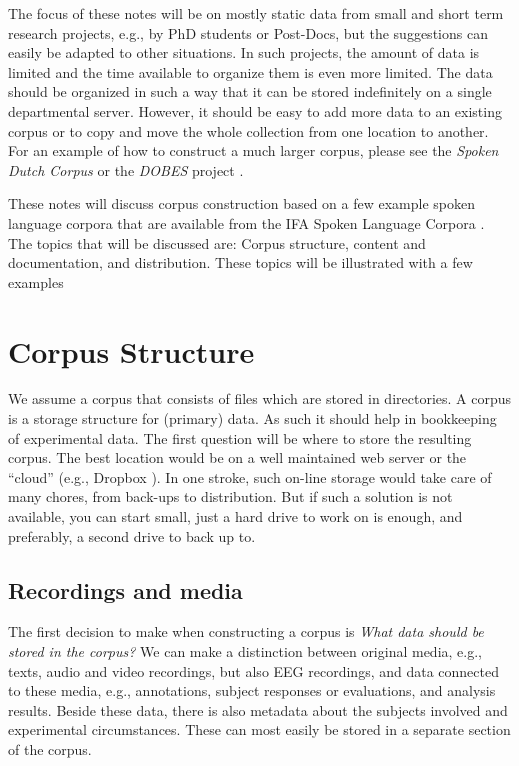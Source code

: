 \documentclass[10pt, a4paper]{article}
\begin{document}
The focus of these notes will be on mostly static data from small and short term research projects, e.g., by PhD students or Post-Docs, but the suggestions can easily be adapted to other situations. In such projects, the amount of data is limited and the time available to organize them is even more limited. The data should be organized in such a way that it can be stored indefinitely on a single departmental server. However, it should be easy to add more data to an existing corpus or to copy and move the whole collection from one location to another. For an example of how to construct a much larger corpus, please see the \emph{Spoken Dutch Corpus} \cite{oostdijk2000spoken,oostdijk2001design} or the \emph{DOBES} project \cite{wittenburg2002methods}.


These notes will discuss corpus construction based on a few example spoken language corpora that are available from the IFA Spoken Language Corpora \cite{VanSonetal2001,vanSon2008ifadv,VanSon2009Prom,IFA}. The topics that will be discussed are: Corpus structure, content and documentation, and distribution. These topics will be illustrated with a few examples


\section{Corpus Structure}

We assume a corpus that consists of files which are stored in directories. A corpus is a storage structure for (primary) data. As such it should help in bookkeeping of experimental data. The first question will be where to store the resulting corpus. The best location would be on a well maintained web server or the ``cloud'' (e.g., Dropbox \cite{Dropbox}). In one stroke, such on-line storage would take care of many chores, from back-ups to distribution. But if such a solution is not available, you can start small, just a hard drive to work on is enough, and preferably, a second drive to back up to. 

\subsection{Recordings and media}

The first decision to make when constructing a corpus is \emph{What data should be stored in the corpus?} We can make a distinction between original media, e.g., texts, audio and video recordings, but also EEG recordings, and data connected to these media, e.g., annotations, subject responses or evaluations, and analysis results. Beside these data, there is also metadata about the subjects involved and experimental circumstances. These can most easily be stored in a separate section of the corpus.
\end{document}
